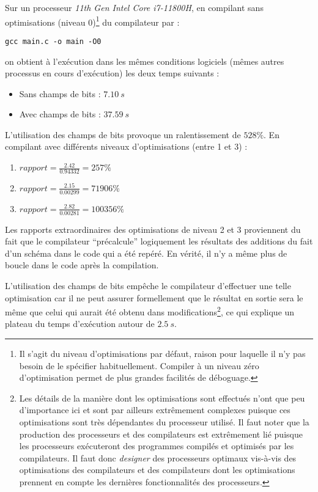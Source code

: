 \documentclass[../../../main.tex]{subfiles}
\begin{document}
Sur un processeur \textit{11th Gen Intel Core i7-11800H}, en compilant sans optimisations (niveau 0)\footnote{Il s'agit du niveau d'optimisations par défaut, raison pour laquelle il n'y pas besoin de le spécifier habituellement. Compiler à un niveau zéro d'optimisation permet de plus grandes facilités de déboguage.} du compilateur par :
\begin{verbatim}
gcc main.c -o main -O0
\end{verbatim}
on obtient à l'exécution dans les mêmes conditions logiciels (mêmes autres processus en cours d'exécution) les deux temps suivants :
\begin{itemize}
	\item Sans champs de bits : $7.10\ s$
	\item Avec champs de bits : $37.59\ s$
\end{itemize}
L'utilisation des champs de bits provoque un ralentissement de $528 \%$.
En compilant avec différents niveaux d'optimisations (entre 1 et 3) :
\begin{enumerate}
	\item $rapport = \frac{2.42}{0.94332} = 257\%$
	\item $rapport = \frac{2.15}{0.00299} = 71906\%$
	\item $rapport = \frac{2.82}{0.00281} = 100356\%$
\end{enumerate}
Les rapports extraordinaires des optimisations de niveau 2 et 3 proviennent du fait que le compilateur ``précalcule'' logiquement les résultats des additions du fait d'un schéma dans le code qui a été repéré. En vérité, il n'y a même plus de boucle dans le code après la compilation.

L'utilisation des champs de bits empêche le compilateur d'effectuer une telle optimisation car il ne peut assurer formellement que le résultat en sortie sera le même que celui qui aurait été obtenu dans modifications\footnote{Les détails de la manière dont les optimisations sont effectués n'ont que peu d'importance ici et sont par ailleurs extrêmement complexes puisque ces optimisations sont très dépendantes du processeur utilisé. Il faut noter que la production des processeurs et des compilateurs est extrêmement lié puisque les processeurs exécuteront des programmes compilés et optimisés par les compilateurs. Il faut donc \textit{designer} des processeurs optimaux vis-à-vis des optimisations des compilateurs et des compilateurs dont les optimisations prennent en compte les dernières fonctionnalités des processeurs.}, ce qui explique un plateau du temps d'exécution autour de $2.5\ s$.
\end{document}
